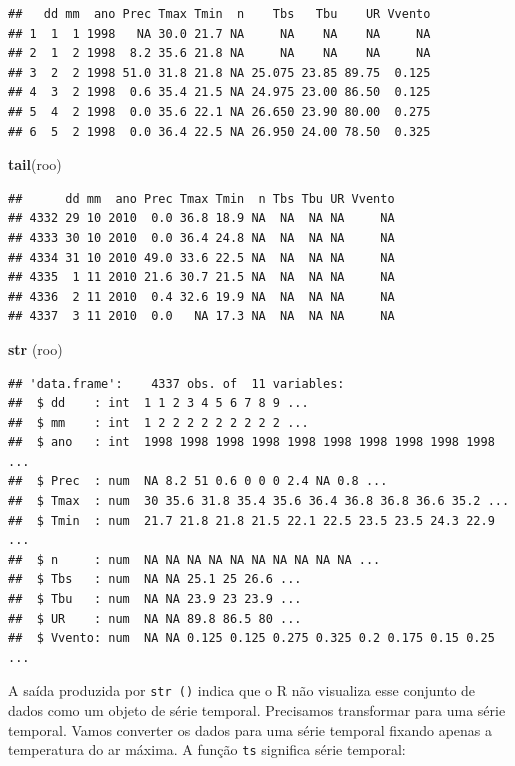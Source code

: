 \documentclass[
]{book}
\newenvironment{Shaded}{\begin{snugshade}}{\end{snugshade}}
\newcommand{\KeywordTok}[1]{\textcolor[rgb]{0.13,0.29,0.53}{\textbf{#1}}}
\newcommand{\NormalTok}[1]{#1}
\begin{document}
\begin{verbatim}
##   dd mm  ano Prec Tmax Tmin  n    Tbs   Tbu    UR Vvento
## 1  1  1 1998   NA 30.0 21.7 NA     NA    NA    NA     NA
## 2  1  2 1998  8.2 35.6 21.8 NA     NA    NA    NA     NA
## 3  2  2 1998 51.0 31.8 21.8 NA 25.075 23.85 89.75  0.125
## 4  3  2 1998  0.6 35.4 21.5 NA 24.975 23.00 86.50  0.125
## 5  4  2 1998  0.0 35.6 22.1 NA 26.650 23.90 80.00  0.275
## 6  5  2 1998  0.0 36.4 22.5 NA 26.950 24.00 78.50  0.325
\end{verbatim}

\begin{Shaded}
\begin{Highlighting}[]
\KeywordTok{tail}\NormalTok{(roo)}
\end{Highlighting}
\end{Shaded}

\begin{verbatim}
##      dd mm  ano Prec Tmax Tmin  n Tbs Tbu UR Vvento
## 4332 29 10 2010  0.0 36.8 18.9 NA  NA  NA NA     NA
## 4333 30 10 2010  0.0 36.4 24.8 NA  NA  NA NA     NA
## 4334 31 10 2010 49.0 33.6 22.5 NA  NA  NA NA     NA
## 4335  1 11 2010 21.6 30.7 21.5 NA  NA  NA NA     NA
## 4336  2 11 2010  0.4 32.6 19.9 NA  NA  NA NA     NA
## 4337  3 11 2010  0.0   NA 17.3 NA  NA  NA NA     NA
\end{verbatim}

\begin{Shaded}
\begin{Highlighting}[]
\KeywordTok{str}\NormalTok{ (roo)}
\end{Highlighting}
\end{Shaded}

\begin{verbatim}
## 'data.frame':    4337 obs. of  11 variables:
##  $ dd    : int  1 1 2 3 4 5 6 7 8 9 ...
##  $ mm    : int  1 2 2 2 2 2 2 2 2 2 ...
##  $ ano   : int  1998 1998 1998 1998 1998 1998 1998 1998 1998 1998 ...
##  $ Prec  : num  NA 8.2 51 0.6 0 0 0 2.4 NA 0.8 ...
##  $ Tmax  : num  30 35.6 31.8 35.4 35.6 36.4 36.8 36.8 36.6 35.2 ...
##  $ Tmin  : num  21.7 21.8 21.8 21.5 22.1 22.5 23.5 23.5 24.3 22.9 ...
##  $ n     : num  NA NA NA NA NA NA NA NA NA NA ...
##  $ Tbs   : num  NA NA 25.1 25 26.6 ...
##  $ Tbu   : num  NA NA 23.9 23 23.9 ...
##  $ UR    : num  NA NA 89.8 86.5 80 ...
##  $ Vvento: num  NA NA 0.125 0.125 0.275 0.325 0.2 0.175 0.15 0.25 ...
\end{verbatim}

A saída produzida por \texttt{str\ ()} indica que o R não visualiza esse conjunto de dados como um objeto de série temporal. Precisamos transformar para uma série temporal.
Vamos converter os dados para uma série temporal fixando apenas a temperatura do ar máxima. A função \texttt{ts} significa série temporal:
\end{document}
